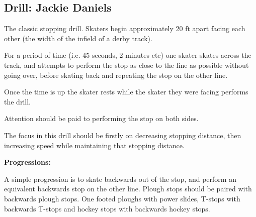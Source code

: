 \subsection*{Drill: Jackie Daniels} 
\label{drill:stopping/jackie_daniels}


The classic stopping drill.
Skaters begin approximately 20 ft apart facing each other (the width of the infield of a derby track).

For a period of time (i.e. 45 seconds, 2 minutes etc) one skater skates across the track, and attempts to perform the stop as close to the line as possible without going over, before skating back and repeating the stop on the other line.   

Once the time is up the skater rests while the skater they were facing performs the drill. 

Attention should be paid to performing the stop on both sides.  


The focus in this drill should be firstly on decreasing stopping distance, then increasing speed while maintaining that stopping distance.

{\bf Progressions:}

A simple progression is to skate backwards out of the stop, and perform an equivalent backwards stop on the other line.
Plough stops should be paired with backwards plough stops. One footed ploughs with power slides, T-stops with backwards T-stops and hockey stops with backwards hockey stops.
